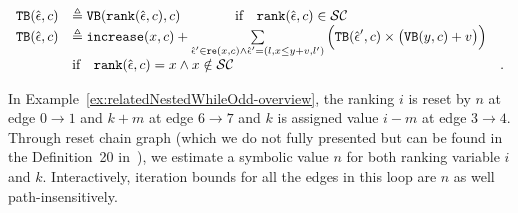 \begin{defn}
{%
\[ 
\begin{array}{lll}
  {\ensuremath{\mathtt{TB}}}(\hat{\mathtt{\epsilon}{}}, c) 
  & \triangleq {\ensuremath{\mathtt{VB}}}(\mathtt{rank}(\hat{\mathtt{\epsilon}{}}, c), c)   \qquad \qquad  \text{if} \quad  \mathtt{rank}(\hat{\mathtt{\epsilon}{}}, c) \in \mathcal{SC} & \\
  {\mathtt{TB}}(\hat{\mathtt{\epsilon}{}}, c) 
  & \triangleq \mathtt{increase}(x, c) 
   + 
  \sum\limits_{\hat{\mathtt{\epsilon}{}}' \in \mathtt{re}(x, c) \land \hat{\mathtt{\epsilon}{}}' = (l, x \leq y + v, l') }
  \Big( {\mathtt{TB}}(\hat{\mathtt{\epsilon}{}}', c) \times \big( {\mathtt{VB}}(y, c) + v \big) \Big)
  & \\
  &  \text{if} \quad  \mathtt{rank}(\hat{\mathtt{\epsilon}{}}, c) = x \land x \notin \mathcal{SC} &.
\end{array}
  \]
}
\end{defn}
In Example~\ref{ex:relatedNestedWhileOdd-overview}, the ranking $i$ is reset by $n$ at edge $0 \to 1$ and 
$k + m$ at edge $6 \to 7$ and $k$ is assigned value $i - m$ at edge $3 \to 4$. Through reset chain graph (which we do not fully presented but can be found in the Definition~20 in~\cite{SinnZV17}), we estimate a symbolic value $n$ for both ranking variable $i$ and $k$.
Interactively, iteration bounds for all the edges in this loop are $n$ as well path-insensitively.
